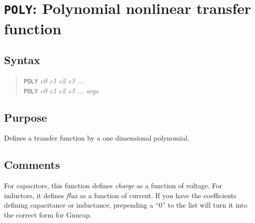 %
%
%
%
\section{{\tt POLY}: Polynomial nonlinear transfer function}
\subsection{Syntax}
\begin{verse}
{\tt POLY} {\it c0 c1 c2 c3 ...}\\
{\tt POLY} {\it c0 c1 c2 c3 ... args}
\end{verse}
\subsection{Purpose}

Defines a transfer function by a one dimensional polynomial.
\subsection{Comments}

For capacitors, this function defines {\em charge} as a function of
voltage.  For inductors, it defines {\em flux} as a function of
current.  If you have the coefficients defining capacitance or
inductance, prepending a ``0'' to the list will turn it into the
correct form for Gnucap.


